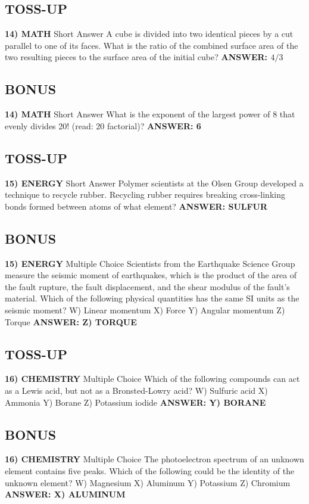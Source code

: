 \documentclass{article}
\begin{document}
\subsection*{TOSS-UP}
\textbf{14) MATH}
Short Answer A cube is divided into two identical pieces by a cut parallel to one of its faces.
What is the ratio of the combined surface area of the two resulting pieces to the surface area of the initial cube?
\textbf{ANSWER: $4/3$}

\subsection*{BONUS}
\textbf{14) MATH}
Short Answer What is the exponent of the largest power of 8 that evenly divides 20! (read: 20 factorial)?
\textbf{ANSWER: 6}

\newpage

\subsection*{TOSS-UP}
\textbf{15) ENERGY}
Short Answer Polymer scientists at the Olsen Group developed a technique to recycle rubber.
Recycling rubber requires breaking cross-linking bonds formed between atoms of what element?
\textbf{ANSWER: SULFUR}

\subsection*{BONUS}
\textbf{15) ENERGY}
Multiple Choice Scientists from the Earthquake Science Group measure the seismic moment of earthquakes, which is the product of the area of the fault rupture, the fault displacement, and the shear modulus of the fault's material.
Which of the following physical quantities has the same SI units as the seismic moment?
W) Linear momentum
X) Force
Y) Angular momentum
Z) Torque
\textbf{ANSWER: Z) TORQUE}

\newpage

\subsection*{TOSS-UP}
\textbf{16) CHEMISTRY}
Multiple Choice Which of the following compounds can act as a Lewis acid, but not as a Bronsted-Lowry acid?
W) Sulfuric acid
X) Ammonia
Y) Borane
Z) Potassium iodide
\textbf{ANSWER: Y) BORANE}

\subsection*{BONUS}
\textbf{16) CHEMISTRY}
Multiple Choice The photoelectron spectrum of an unknown element contains five peaks. Which of the following could be the identity of the unknown element?
W) Magnesium
X) Aluminum
Y) Potassium
Z) Chromium
\textbf{ANSWER: X) ALUMINUM}
\end{document}
